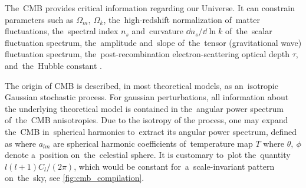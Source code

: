 The~CMB provides critical information regarding our Universe. It can constrain parameters such as $\Omega_m,\ \Omega_k$, the~high-redshift normalization of~matter fluctuations, the~spectral index $n_s$ and~curvature $\dd n_s/\dd \ln k$ of~the~scalar fluctuation spectrum, the~amplitude and~slope of~the~tensor (gravitational wave) fluctuation spectrum, the~post-recombination electron-scattering optical depth $\tau$, and~the~Hubble constant \parencite{weinberg_observational_2013}.

The origin of CMB is described, in most theoretical models, as an~isotropic Gaussian stochastic process. For gaussian perturbations, all information about the underlying theoretical model is contained in the~angular power spectrum of~the~CMB anisotropies. Due to the isotropy of the process, one may expand the~CMB in~spherical harmonics to~extract its angular power spectrum, defined as \parencite{2015IJMPD..2430004B}
where $a_{lm}$ are spherical harmonic coefficients of~temperature map $T$
where $\theta,\ \phi$  denote a~position on~the~celestial sphere. It is customary to~plot the~quantity $l(l+1)C_l/(2\pi)$, which would be constant for~a~scale-invariant pattern on~the~sky, see \autoref{fig:cmb_compilation}.

